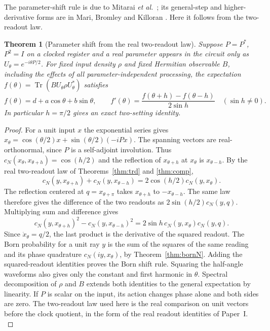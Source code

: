 \documentclass[aps,pra,onecolumn,superscriptaddress,nofootinbib,10pt]{revtex4-2}
\newtheorem{theorem}{Theorem}
\theoremstyle{definition}
\theoremstyle{remark}
\begin{document}
\noindent The parameter-shift rule is due to Mitarai \emph{et al.}\ \cite{rf:Mitarai2018}; its general-step and higher-derivative
forms are in Mari, Bromley and Killoran \cite{rf:Mari2021}.  Here it follows from the two-readout law.

\begin{theorem}[Parameter shift from the real two-readout law]\label{cp:shift}
Suppose $P=P^*$, $P^2=I$ on a clocked register and a real parameter appears in the circuit only as $U_\theta=e^{-i\theta P/2}$. For fixed input density $\rho$ and fixed Hermitian observable $B$, including the effects of all parameter-independent processing, the expectation
$f(\theta)=\operatorname{Tr}(B U_\theta\rho U_\theta^*)$ satisfies
\[
 f(\theta)=d+a\cos\theta+b\sin\theta,\qquad
 f'(\theta)=\frac{f(\theta+h)-f(\theta-h)}{2\sin h}
 \quad(\sin h\ne0).
\]
In particular $h=\pi/2$ gives an exact two-setting identity. \cite{n5-shift-ref}
\end{theorem}
\begin{proof}
For a unit input $x$ the exponential series gives $x_\theta=\cos(\theta/2)x+\sin(\theta/2)(-iPx)$. The spanning vectors are real-orthonormal, since $P$ is a self-adjoint involution. Thus $c_N(x_\theta,x_{\theta+h})=\cos(h/2)$ and the reflection of $x_{\theta+h}$ at $x_\theta$ is $x_{\theta-h}$. By the real two-readout law of Theorems~\ref{thm:trd} and \ref{thm:comp},
\[
 c_N(y,x_{\theta+h})+c_N(y,x_{\theta-h})
 =2\cos(h/2)c_N(y,x_\theta).
\]
The reflection centered at $q=x_{\theta+\pi}$ takes $x_{\theta+h}$ to $-x_{\theta-h}$. The same law therefore gives the difference of the two readouts as $2\sin(h/2)c_N(y,q)$. Multiplying sum and difference gives
\[
 c_N(y,x_{\theta+h})^2-c_N(y,x_{\theta-h})^2
 =2\sin h\,c_N(y,x_\theta)c_N(y,q).
\]
Since $\dot x_\theta=q/2$, the last product is the derivative of the squared readout. The Born probability for a unit ray $y$ is the sum of the squares of the same reading and its phase quadrature $c_N(iy,x_\theta)$, by Theorem~\ref{thm:bornN}. Adding the squared-readout identities proves the Born shift rule. Squaring the half-angle waveforms also gives only the constant and first harmonic in $\theta$. Spectral decomposition of $\rho$ and $B$ extends both identities to the general expectation by linearity. If $P$ is scalar on the input, its action changes phase alone and both sides are zero. The two-readout law used here is the real comparison on unit vectors before the clock quotient, in the form of the real readout identities of Paper~I. \cite{PaperI}
\end{proof}
\end{document}
